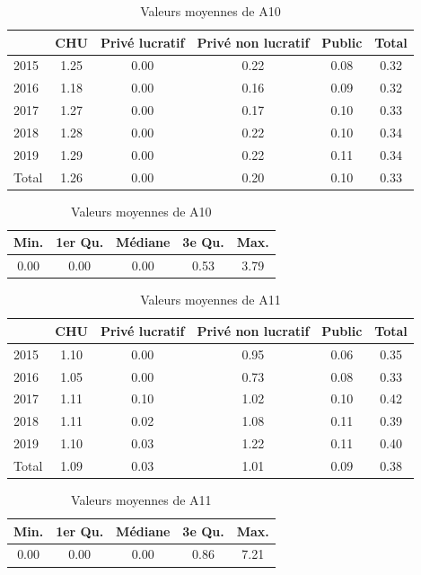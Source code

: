 \begin{table}[ht]
\centering
\caption{Valeurs moyennes de A10} 
\label{A10_des}
\begin{tabular}{l|cccc|c}
  \hline
 & CHU & Privé lucratif & Privé non lucratif & Public & Total \\ 
  \hline
2015 & 1.25 & 0.00 & 0.22 & 0.08 & 0.32 \\ 
  2016 & 1.18 & 0.00 & 0.16 & 0.09 & 0.32 \\ 
  2017 & 1.27 & 0.00 & 0.17 & 0.10 & 0.33 \\ 
  2018 & 1.28 & 0.00 & 0.22 & 0.10 & 0.34 \\ 
  2019 & 1.29 & 0.00 & 0.22 & 0.11 & 0.34 \\ 
  \hline
  Total & 1.26 & 0.00 & 0.20 & 0.10 & 0.33 \\ 
   \hline
\end{tabular}

\bigskip

\begin{tabular}{ccccc}
  \hline
Min. & 1er Qu. & Médiane & 3e Qu. & Max. \\ 
  \hline
0.00 & 0.00 & 0.00 & 0.53 & 3.79 \\ 
   \hline
\end{tabular}
\end{table}


\begin{table}[!ht]
\centering
\caption{Valeurs moyennes de A11} 
\label{A11_des}
\begin{tabular}{l|cccc|c}
  \hline
 & CHU & Privé lucratif & Privé non lucratif & Public & Total \\ 
  \hline
2015 & 1.10 & 0.00 & 0.95 & 0.06 & 0.35 \\ 
  2016 & 1.05 & 0.00 & 0.73 & 0.08 & 0.33 \\ 
  2017 & 1.11 & 0.10 & 1.02 & 0.10 & 0.42 \\ 
  2018 & 1.11 & 0.02 & 1.08 & 0.11 & 0.39 \\ 
  2019 & 1.10 & 0.03 & 1.22 & 0.11 & 0.40 \\ 
  \hline
  Total & 1.09 & 0.03 & 1.01 & 0.09 & 0.38 \\ 
   \hline
\end{tabular}

\bigskip

\begin{tabular}{ccccc}
  \hline
Min. & 1er Qu. & Médiane & 3e Qu. & Max. \\ 
  \hline
0.00 & 0.00 & 0.00 & 0.86 & 7.21 \\ 
   \hline
\end{tabular}
\end{table}

